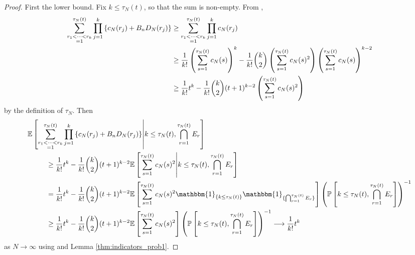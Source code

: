 \documentclass{article}
\newcommand{\Prob}{\mathbb{P}}
\newcommand{\E}{\mathbb{E}}
\newcommand{\I}[1]{\mathbbm{1}_{\{#1\}}}
\newcommand{\1}[1]{\mathbbm{1}_{#1}}
\begin{document}
\begin{proof}
First the lower bound. 
Fix $k\leq \tau_N(t)$, so that the sum is non-empty.
From \citet[Equation (8)]{koskela2018},
\begin{align}
\sum_{\substack{r_1<\dots<r_k \\ =1}}^{\tau_N(t)}\prod_{j=1}^k 
\left\{ c_N(r_j) + B_n D_N(r_j) \right\}
&\geq \sum_{\substack{r_1<\dots<r_k \\ =1}}^{\tau_N(t)}\prod_{j=1}^k c_N(r_j) \notag\\
&\geq \frac{1}{k!} \left( \sum_{s=1}^{\tau_N(t)} c_N(s) \right)^k 
- \frac{1}{k!} \binom{k}{2} \left( \sum_{s=1}^{\tau_N(t)} c_N(s)^2 \right)
\left( \sum_{s=1}^{\tau_N(t)} c_N(s) \right)^{k-2} \notag\\
&\geq \frac{1}{k!} t^k
 - \frac{1}{k!} \binom{k}{2} (t+1)^{k-2} \left( \sum_{s=1}^{\tau_N(t)} c_N(s)^2 \right) 
\end{align}
by the definition of $\tau_N$.
Then
\begin{align}\label{eq:10}
\E &\left[ \sum_{\substack{r_1<\dots<r_k \\ =1}}^{\tau_N(t)}\prod_{j=1}^k 
\left\{ c_N(r_j) + B_n D_N(r_j) \right\}  
\middle| k\leq\tau_N(t), \bigcap_{r=1}^{\tau_N(t)} E_r \right] \notag\\
&\qquad \geq \frac{1}{k!} t^k - \frac{1}{k!} \binom{k}{2} (t+1)^{k-2} \E\left[ \sum_{s=1}^{\tau_N(t)} c_N(s)^2 \middle| k\leq\tau_N(t), \bigcap_{r=1}^{\tau_N(t)} E_r \right] \notag\\
&\qquad = \frac{1}{k!} t^k - \frac{1}{k!} \binom{k}{2} (t+1)^{k-2} \E\left[ \sum_{s=1}^{\tau_N(t)} c_N(s)^2 \I{k\leq\tau_N(t)} \I{\bigcap_{r=1}^{\tau_N(t)} E_r} \right] \left(\Prob \left[k\leq\tau_N(t), \bigcap_{r=1}^{\tau_N(t)} E_r \right] \right)^{-1}  \notag\\
&\qquad \geq \frac{1}{k!} t^k - \frac{1}{k!} \binom{k}{2} (t+1)^{k-2} \E\left[ \sum_{s=1}^{\tau_N(t)} c_N(s)^2 \right]
\left(\Prob \left[k\leq\tau_N(t), \bigcap_{r=1}^{\tau_N(t)} E_r \right] \right)^{-1}
\longrightarrow \frac{1}{k!} t^k
\end{align}
as $N\to\infty$ using \citet[Equation (5)]{brown2020} and Lemma \ref{thm:indicators_prob1}. %


\end{proof}
\end{document}
